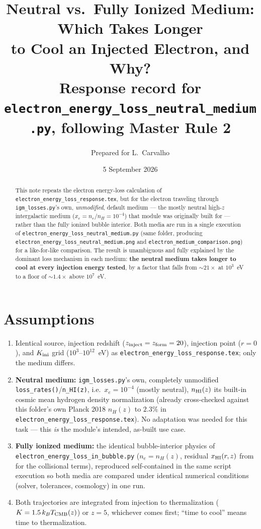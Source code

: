 \documentclass[11pt,a4paper]{article}
\title{\bf Neutral vs.\ Fully Ionized Medium: Which Takes Longer\\ to Cool an Injected Electron, and Why?\\[2mm]
\large Response record for \texttt{electron\_energy\_loss\_neutral\_medium.py}, following Master Rule 2}
\author{Prepared for L.\ Carvalho}
\date{5 September 2026}
\begin{document}
\maketitle

\begin{abstract}
\noindent
This note repeats the electron energy-loss calculation of
\texttt{electron\_energy\_loss\_response.tex}, but for the electron traveling through
\texttt{igm\_losses.py}'s own, \emph{unmodified}, default medium --- the mostly neutral high-$z$
intergalactic medium ($x_e=n_e/n_H=10^{-4}$) that module was originally built for --- rather than the
fully ionized bubble interior. Both media are run in a single execution of
\texttt{electron\_energy\_loss\_neutral\_medium.py} (same folder, producing
\texttt{electron\_energy\_loss\_neutral\_medium.png} and \texttt{electron\_medium\_comparison.png}) for a
like-for-like comparison. The result is unambiguous and fully explained by the dominant loss mechanism in
each medium: \textbf{the neutral medium takes longer to cool at every injection energy tested},
by a factor that falls from $\sim21\times$ at $10^3$~eV to a floor of $\sim1.4\times$ above $10^7$~eV.
\end{abstract}

\tableofcontents

\section{Assumptions}
\label{sec:assumptions}

\begin{enumerate}
\item Identical source, injection redshift ($z_{\rm inject}=z_{\rm form}=20$), injection point ($r=0$), and
      $K_{\rm ini}$ grid ($10^3$--$10^{12}$~eV) as \texttt{electron\_energy\_loss\_response.tex}; only the
      medium differs.
\item \textbf{Neutral medium:} \texttt{igm\_losses.py}'s own, completely unmodified
      \texttt{loss\_rates()}/\texttt{n\_HI(z)}, i.e.\ $x_e=10^{-4}$ (mostly neutral), $n_{\rm HI}(z)$ its
      built-in cosmic mean hydrogen density normalization (already cross-checked against this folder's own
      Planck 2018 $n_H(z)$ to $2.3\%$ in \texttt{electron\_energy\_loss\_response.tex}). No adaptation was
      needed for this task --- this \emph{is} the module's intended, as-built use case.
\item \textbf{Fully ionized medium:} the identical bubble-interior physics of
      \texttt{electron\_energy\_loss\_in\_bubble.py} ($n_e=n_H(z)$, residual
      $x_{\rm HI}(r,z)$ from \citealt{Cen2000} for the collisional terms), reproduced self-contained in the
      same script execution so both media are compared under identical numerical conditions (solver,
      tolerances, cosmology) in one run.
\item Both trajectories are integrated from injection to thermalization ($K=1.5\,k_BT_{\rm CMB}(z)$) or
      $z=5$, whichever comes first; ``time to cool'' means time to thermalization.
\end{enumerate}
\end{document}
